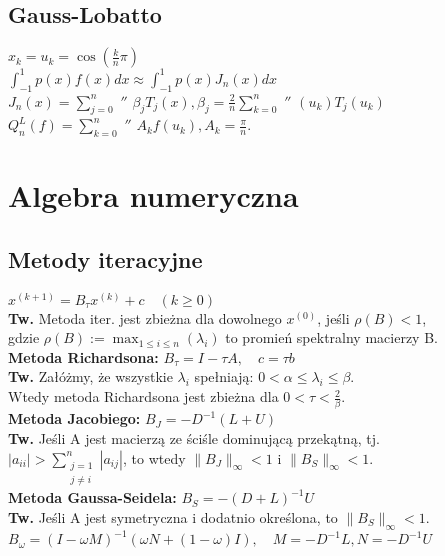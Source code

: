 \documentclass[a4paper,twocolumn]{article}
\begin{document}
\subsection{Gauss-Lobatto}
\noindent
$x_k=u_k=\cos\left(\frac{k}{n}\pi\right)$ \\
$\int_{-1}^1p(x)f(x)dx \approx \int_{-1}^1p(x)J_n(x)dx$ \\
$ J_n(x)=\sum_{j=0}^{n}  $ $''$ $ \beta_jT_j(x), \beta_j=\frac{2}{n}\sum_{k=0}^n $ $''$ $  (u_k)T_j(u_k)$\\
$Q_n^{L}(f)=\sum_{k=0}^{n} $ $''$ $ A_kf(u_k), A_k=\frac{\pi}{n}.$



\section{Algebra numeryczna}
\subsection{Metody iteracyjne}
${x}^{(k+1)} = B_{\tau} {x}^{(k)} + {c} \hspace{1em} (k \geq 0)$\\
\textbf{Tw.} Metoda iter. jest zbieżna dla dowolnego $x^{(0)}$, jeśli $\rho(B)<1$,\\
gdzie $\rho(B):=\max_{1 \leq i \leq n} (\lambda_i)$ to promień spektralny macierzy B.\\
\textbf{Metoda Richardsona:} $B_{\tau} = I - \tau A, \hspace{1em} c = \tau b \hspace{1em}$\\
\textbf{Tw.} Załóżmy, że wszystkie $\lambda_i$ spełniają: $0 < \alpha \leq \lambda_i \leq \beta$.\\
Wtedy metoda Richardsona jest zbieżna dla $0 < \tau < \frac{2}{\beta}$.\\
\textbf{Metoda Jacobiego:} $B_J = -D^{-1}(L+U) \hspace{1em}$\\
\textbf{Tw.} Jeśli A jest macierzą ze ściśle dominującą przekątną, tj.\\
$|a_{ii}|>\sum\limits_{\begin{smallmatrix}j=1\\j\neq i\end{smallmatrix}}^{n}|a_{ij}|$, to wtedy $\|B_J\|_\infty < 1$ i $\|B_S\|_\infty < 1$.\\
\textbf{Metoda Gaussa-Seidela:} $B_S = -(D+L)^{-1}U \hspace{1em}$\\
\textbf{Tw.} Jeśli A jest symetryczna i dodatnio określona, to $\|B_S\|_\infty < 1$.\\
$B_{\omega} = (I - \omega M)^{-1} (\omega N + (1 - \omega)I), \hspace{1em} M = -D^{-1}L, N = -D^{-1} U$
\end{document}
